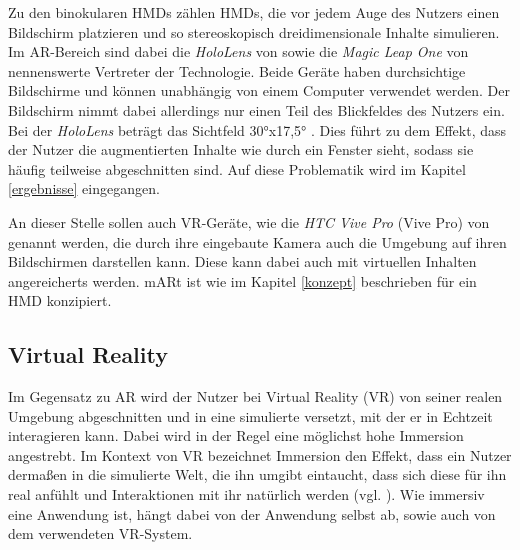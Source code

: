 Zu den binokularen HMDs zählen HMDs, die vor jedem Auge des Nutzers einen Bildschirm platzieren und so stereoskopisch dreidimensionale Inhalte simulieren. Im AR-Bereich sind dabei die \textit{HoloLens} von \cite{hololens} sowie die \textit{Magic Leap One} von \cite{magicLeap} nennenswerte Vertreter der Technologie. Beide Geräte haben durchsichtige Bildschirme und können unabhängig von einem Computer verwendet werden. 
Der Bildschirm nimmt dabei allerdings nur einen Teil des Blickfeldes des Nutzers ein. Bei der \textit{HoloLens} beträgt das Sichtfeld 30°x17,5° \cite{hololensFOV}. Dies führt zu dem Effekt, dass der Nutzer die augmentierten Inhalte wie durch ein Fenster sieht, sodass sie häufig teilweise abgeschnitten sind. Auf diese Problematik wird im Kapitel \ref{ergebnisse} eingegangen. 

An dieser Stelle sollen auch VR-Geräte, wie die \textit{HTC Vive Pro} (Vive Pro) von \cite{vivePro} genannt werden, die durch ihre eingebaute Kamera auch die Umgebung auf ihren Bildschirmen darstellen kann. Diese kann dabei auch mit virtuellen Inhalten angereicherts werden. 
mARt ist wie im Kapitel \ref{konzept} beschrieben für ein HMD konzipiert.


\subsection{Virtual Reality}
\label{vr}

Im Gegensatz zu AR wird der Nutzer bei Virtual Reality (VR) von seiner realen Umgebung abgeschnitten und in eine simulierte versetzt, mit der er in Echtzeit interagieren kann. Dabei wird in der Regel eine möglichst hohe Immersion angestrebt. 
Im Kontext von VR bezeichnet Immersion den Effekt, dass ein Nutzer dermaßen in die simulierte Welt, die ihn umgibt eintaucht, dass sich diese für ihn real anfühlt und Interaktionen mit ihr natürlich werden (vgl. \cite{Witmer98}). Wie immersiv eine Anwendung ist, hängt dabei von der Anwendung selbst ab, sowie auch von dem verwendeten VR-System. 

